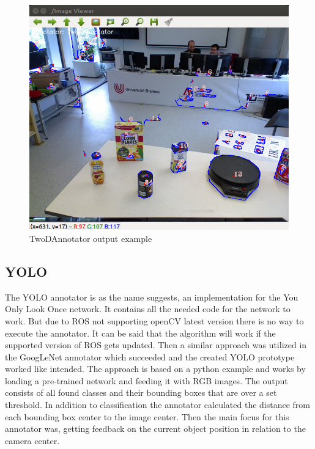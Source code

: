 \documentclass[main.tex]{subfiles}
\begin{document}
\begin{figure}[H]
\centering
\includegraphics[width=1\textwidth]{pictures/perception/TwoDAnnotator.png}
\caption{TwoDAnnotator output example}
\end{figure}
				\subsection{YOLO}
The YOLO annotator is as the name suggests, an implementation for the You Only Look Once network. It contains all the needed code for the network to work.
But due to ROS not supporting openCV latest version there is no way to execute the annotator. It can be said that the algorithm will work if the supported version of ROS gets updated. Then a similar approach was utilized in the GoogLeNet annotator which succeeded and the created YOLO prototype worked like intended.
The approach is based on a python example and works by loading a pre-trained network and feeding it with RGB images. The output consists of all found classes and their bounding boxes that are over a set threshold.
In addition to classification the annotator calculated the distance from each bounding box center to the image center. Then the main focus for this annotator was, getting feedback on the current object position in relation to the camera center.
\end{document}
